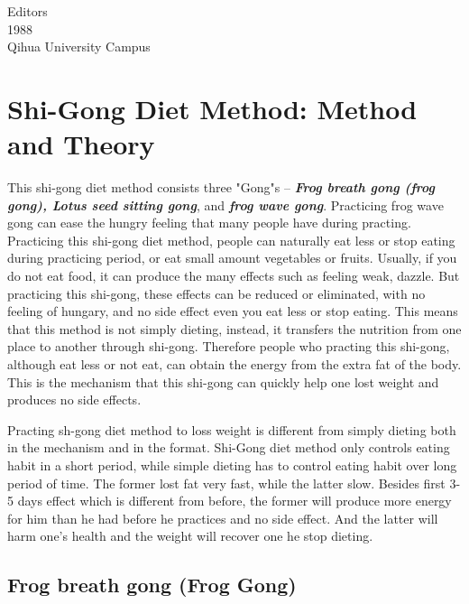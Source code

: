 \vspace{0.25 in} 

Editors\\
1988 \\
Qihua University Campus

\chapter{Shi-Gong Diet Method: Method and Theory}
This shi-gong diet method consists three "Gong"s -- {\bf\em Frog breath gong (frog gong), Lotus seed sitting gong},
and {\bf\em frog wave gong}. Practicing frog wave gong can ease the hungry feeling that many people have during
practing. Practicing this shi-gong diet method, people can naturally eat less or stop eating during practicing period,
or eat small amount vegetables or fruits. Usually, if you do not eat food, it can produce the many effects such as
feeling weak, dazzle. But practicing this shi-gong, these effects can be reduced or eliminated, with no feeling of
hungary, and no side effect even you eat less or stop eating. This means that this method is not simply dieting, 
instead, it transfers the nutrition from one place to another through shi-gong. Therefore people who practing this
shi-gong, although eat less or not eat, can obtain the energy from the extra fat of the body. This is the mechanism
that this shi-gong can quickly help one lost weight and produces no side effects.
\vspace{0.15 in}

Practing sh-gong diet method to loss weight is different from simply dieting both in the mechanism and in the format.
Shi-Gong diet method only controls eating habit in a short period, while simple dieting has to control eating habit
over long period of time. The former lost fat very fast, while the latter slow. Besides first 3-5 days effect which
is different from before, the former will produce more energy for him than he had before he practices and no side
effect.  And the latter will harm one's health and the weight will recover one he stop dieting.

\section{Frog breath gong (Frog Gong)}
